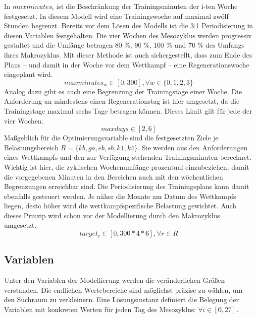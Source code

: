 In $maxminutes_i$ ist die Beschränkung der Trainingsminuten der i-ten Woche festgesetzt. In diesem Modell wird eine Trainingswoche auf maximal zwölf Stunden begrenzt. Bereits vor dem Lösen des Modells ist die 3:1 Periodisierung in diesen Variablen festgehalten. Die vier Wochen des Mesozyklus werden progressiv gestaltet und die Umfänge betragen 80 \%, 90 \%, 100 \% und 70 \% des Umfangs ihres Makrozyklus. Mit dieser Methode ist auch sichergestellt, dass zum Ende des Plans -- und damit in der Woche vor dem Wettkampf -- eine Regenerationswoche eingeplant wird.
\begin{equation}
     maxminutes_w \in [0, 300] , \forall w \in \{0, 1, 2, 3\}
\end{equation}
Analog dazu gibt es auch eine Begrenzung der Trainingstage einer Woche. Die Anforderung an mindestens einen Regenerationstag ist hier umgesetzt, da die Trainingstage maximal sechs Tage betragen können. Dieses Limit gilt für jede der vier Wochen.
\begin{equation}
\label{equation:maxDays}
     maxdays \in [2, 6]
\end{equation}
Maßgeblich für die Optimierungsvariable sind die festgesetzten Ziele je Belastungsbereich $R = \{kb, ga, eb, sb, k1, k4\}$. Sie werden aus den Anforderungen eines Wettkampfs und den zur Verfügung stehenden Trainingsminuten berechnet. Wichtig ist hier, die zyklischen Wochenumfänge prozentual einzubeziehen, damit die vorgegebenen Minuten in den Bereichen auch mit den wöchentlichen Begrenzungen erreichbar sind.\newline
Die Periodisierung des Trainingsplans kann damit ebenfalls gesteuert werden. Je näher die Monate am Datum des Wettkampfs liegen, desto höher wird die wettkampfspezifische Belastung gewichtet. Auch dieses Prinzip wird schon vor der Modellierung durch den Makrozyklus umgesetzt. 
\begin{equation}
    target_{r} \in [0, 300*4*6] , \forall r \in R
\end{equation}

\subsection{Variablen}
Unter den Variablen der Modellierung werden die veränderlichen Größen verstanden. Die endlichen Wertebereiche sind möglichst präzise zu wählen, um den Suchraum zu verkleinern. Eine Lösungsinstanz definiert die Belegung der Variablen mit konkreten Werten für jeden Tag des Mesozyklus:  $\forall i \in [0, 27]$.\par

